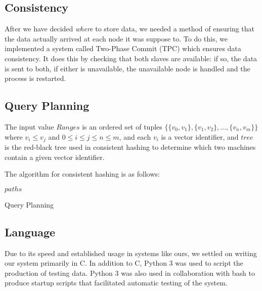 \subsection{Consistency}
After we have decided \emph{where} to store data, we needed a method of ensuring that the data actually arrived at each node it was suppose to.
To do this, we implemented a system called Two-Phase Commit (TPC) which ensures data consistency.
It does this by checking that both slaves are available: if so, the data is sent to both, if either is unavailable, the unavailable node is handled and the process is restarted.
%
\subsection{Query Planning}
The input value $Ranges$ is an ordered set of tuples $\{\{v_0,v_1\},\{v_1,v_2\},\ldots,\{v_n,v_m\}\}$ where $v_i\leq v_j$ and $0\leq i\leq j\leq n\leq m$, and each $v_i$ is a vector identifier, and $tree$ is the red-black tree used in
consistent hashing to determine which two machines contain a given vector identifier.

The algorithm for consistent hashing is as follows:
\begin{algorithm}
    \begin{algorithmic}

                  \Else
                  \EndIf
                \EndFor
          \EndFor
          \Return $paths$
    \end{algorithmic}
    \caption{Query Planning}
\end{algorithm}
%

\subsection{Language}
Due to its speed and established usage in systems like ours, we settled on writing our system primarily in C.
In addition to C, Python 3 was used to script the production of testing data.
Python 3 was also used in collaboration with bash to produce startup scripts that facilitated automatic testing of the system.
